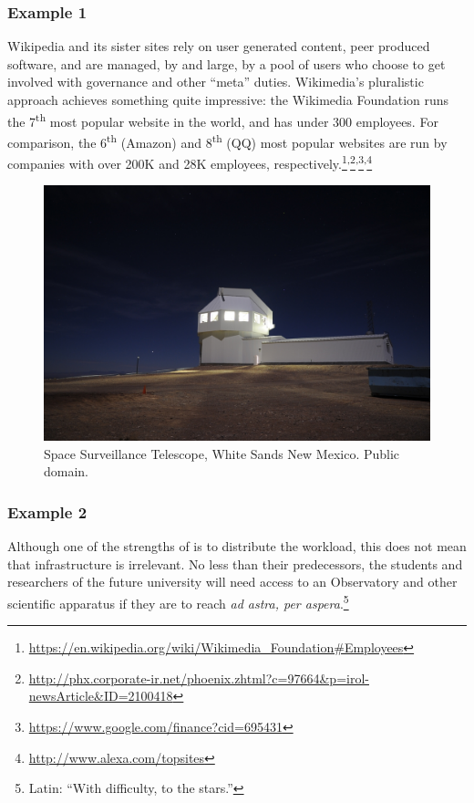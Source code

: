 \subsubsection*{Example 1} Wikipedia and its sister sites rely on user generated content,
peer produced software, and are managed, by and large, by a pool of users who choose to
get involved with governance and other ``meta'' duties.
%
Wikimedia's pluralistic approach achieves something quite impressive: the
Wikimedia Foundation runs the 7\textsuperscript{th} most popular
website in the world, and has under 300 employees.  For comparison,
the 6\textsuperscript{th} (Amazon) and 8\textsuperscript{th} (QQ) most popular
websites are run by companies with over 200K and 28K employees,
respectively.\footnote{\url{https://en.wikipedia.org/wiki/Wikimedia_Foundation\#Employees}}\textsuperscript{,}\footnote{\url{http://phx.corporate-ir.net/phoenix.zhtml?c=97664&p=irol-newsArticle&ID=2100418}}\textsuperscript{,}\footnote{\url{https://www.google.com/finance?cid=695431}}\textsuperscript{,}\footnote{\url{http://www.alexa.com/topsites}}

\begin{figure}
\vspace{-1.5cm}
\begin{center}
\includegraphics[width=.4\textwidth,trim=0 50 0 120, clip=true]{Space_Surveillance_Telescope}
\end{center}
\vspace{-.5cm}
\caption{Space Surveillance Telescope, White Sands New Mexico. Public
  domain.\label{space-surveillance}}
\vspace{-1.1cm}
\end{figure}

\subsubsection*{Example 2} Although one of the strengths of  is to
distribute the workload, this does not mean that infrastructure is
irrelevant.  No less than their predecessors, the students and
researchers of the future university will need access to an
Observatory and other scientific apparatus if they are to
reach \emph{ad astra, per aspera}.\footnote{Latin: ``With difficulty, to the stars.''}

